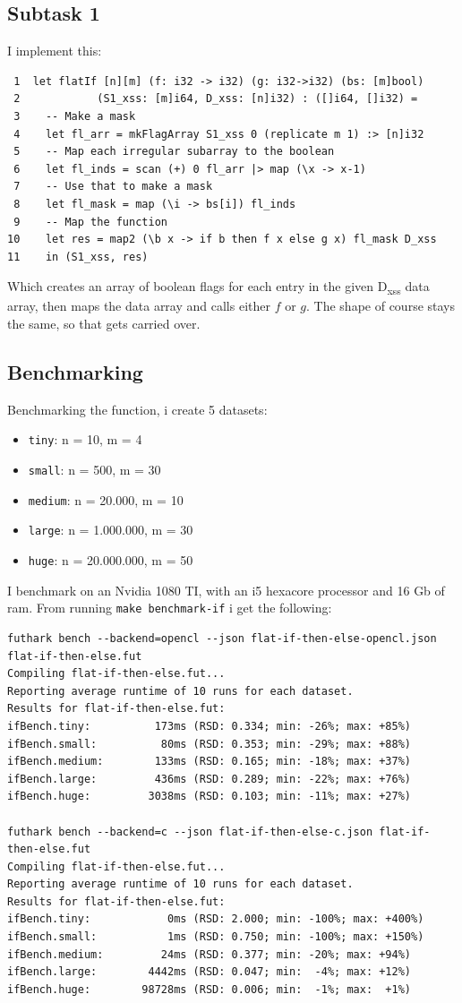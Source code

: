 \documentclass[11pt]{article}
\begin{document}
\subsection{Subtask 1}
\label{sec:org8fdc2d6}
I implement this:
\begin{verbatim}
 1  let flatIf [n][m] (f: i32 -> i32) (g: i32->i32) (bs: [m]bool) 
 2  		  (S1_xss: [m]i64, D_xss: [n]i32) : ([]i64, []i32) =
 3    -- Make a mask
 4    let fl_arr = mkFlagArray S1_xss 0 (replicate m 1) :> [n]i32 
 5    -- Map each irregular subarray to the boolean
 6    let fl_inds = scan (+) 0 fl_arr |> map (\x -> x-1)
 7    -- Use that to make a mask
 8    let fl_mask = map (\i -> bs[i]) fl_inds
 9    -- Map the function
10    let res = map2 (\b x -> if b then f x else g x) fl_mask D_xss
11    in (S1_xss, res)
\end{verbatim}
Which creates an array of boolean flags for each entry in the given D\textsubscript{xss} data array, then maps
the data array and calls either \(f\) or \(g\). The shape of course stays the same, so that gets carried
over.

\subsection{Benchmarking}
\label{sec:orgc00c569}
Benchmarking the function, i create 5 datasets: 
\begin{itemize}
\item \texttt{tiny}: n = 10, m = 4
\item \texttt{small}: n = 500, m = 30
\item \texttt{medium}: n = 20.000, m = 10
\item \texttt{large}: n = 1.000.000, m = 30
\item \texttt{huge}: n = 20.000.000, m = 50
\end{itemize}

I benchmark on an Nvidia 1080 TI, with an i5 hexacore processor and 16 Gb of ram. From running
\texttt{make benchmark-if} i get the following:
\begin{verbatim}
futhark bench --backend=opencl --json flat-if-then-else-opencl.json flat-if-then-else.fut
Compiling flat-if-then-else.fut...
Reporting average runtime of 10 runs for each dataset.
Results for flat-if-then-else.fut:
ifBench.tiny:          173ms (RSD: 0.334; min: -26%; max: +85%)
ifBench.small:          80ms (RSD: 0.353; min: -29%; max: +88%)
ifBench.medium:        133ms (RSD: 0.165; min: -18%; max: +37%)
ifBench.large:         436ms (RSD: 0.289; min: -22%; max: +76%)
ifBench.huge:         3038ms (RSD: 0.103; min: -11%; max: +27%)

futhark bench --backend=c --json flat-if-then-else-c.json flat-if-then-else.fut
Compiling flat-if-then-else.fut...
Reporting average runtime of 10 runs for each dataset.
Results for flat-if-then-else.fut:
ifBench.tiny:            0ms (RSD: 2.000; min: -100%; max: +400%)
ifBench.small:           1ms (RSD: 0.750; min: -100%; max: +150%)
ifBench.medium:         24ms (RSD: 0.377; min: -20%; max: +94%)
ifBench.large:        4442ms (RSD: 0.047; min:  -4%; max: +12%)
ifBench.huge:        98728ms (RSD: 0.006; min:  -1%; max:  +1%)
\end{verbatim}
\end{document}
